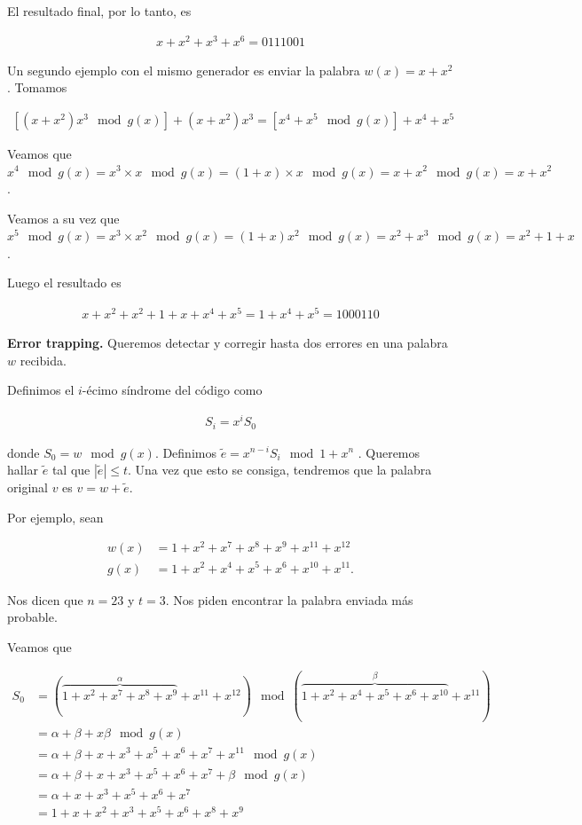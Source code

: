 \documentclass[a4paper]{article}
\begin{document}
El resultado final, por lo tanto, es 

\begin{align*}
    x + x^2 + x^3 + x^6 = 0111001
\end{align*}

Un segundo ejemplo con el mismo generador es enviar la palabra $w(x) = x + x^2$.
Tomamos 

\begin{align*}
    \left[(x + x^2)x^{3} \mod g(x)\right] + (x+x^2) x^3 = \left[x^4 + x^5 \mod
    g(x)\right] + x^4 + x^5
\end{align*}

Veamos que $x^4 \mod g(x) = x^3 \times x \mod g(x) = (1+x) \times x \mod g(x) =
x + x^2 \mod g(x) = x + x^2$.

Veamos a su vez que $x^5 \mod g(x) = x^3 \times x^2 \mod g(x) = (1+x)x^2 \mod
g(x) = x^2 + x^3 \mod g(x) = x^2 + 1 + x$.

Luego el resultado es 

\begin{align*}
    x + x^2 + x^2 + 1 + x + x^4 + x^5 = 1 + x^4 + x^5 = 1000110
\end{align*}

\textbf{Error trapping.} Queremos detectar y corregir hasta dos errores en una
palabra $w$ recibida. 

Definimos el $i$-écimo síndrome del código como 

\begin{align*}
    S_i = x^i S_0
\end{align*}

donde $S_0 = w \mod g(x)$. Definimos $\tilde{ e } = x^{n-i}S_i \mod 1 + x^n$ .
Queremos hallar $\tilde{ e }$ tal que $|\tilde{ e }| \leq t$. Una vez que esto
se consiga, tendremos que la palabra original $v$ es $v = w + \tilde{ e }$.

Por ejemplo, sean

\begin{align*}
    w(x) &= 1 + x^2 + x^7 + x^8 + x^9 + x^{11} + x^{12}  \\ g(x) &= 1 + x^2 + x^4 + x^5 + x^6 + x^{10} + x^{11}.
\end{align*}

Nos dicen que $n = 23$ y $t = 3$. Nos piden encontrar la palabra enviada más
probable.

Veamos que 

\begin{align*}
    S_0 &= \left( \overbrace{1 + x^2 + x^7 + x^8 + x^9}^{\alpha} + x^{11} + x^{12} \right)  \mod
    \left( \overbrace{1 + x^2 + x^4 + x^5 + x^6 + x^{10}}^{\beta} + x^{11} \right) \\ 
        &= \alpha + \beta + x\beta \mod g(x) \\ 
        &= \alpha + \beta + x + x^3 + x^5 + x^6 + x^7 + x^{11} \mod g(x) \\ 
        &= \alpha + \beta + x + x^3 + x^5 + x^6 + x^7 + \beta \mod g(x) \\ 
        &= \alpha + x + x^3 + x^5 + x^6 + x^7 \\ 
        &= 1 + x + x^2 + x^3 +x^5 + x^6 + x^8 + x^9
\end{align*}
\end{document}
